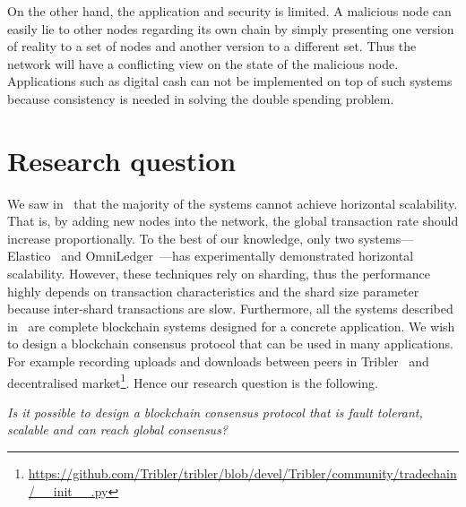 On the other hand, the application and security is limited.
A malicious node can easily lie to other nodes regarding its own chain by simply presenting one version of reality to a set of nodes and another version to a different set.
Thus the network will have a conflicting view on the state of the malicious node.
Applications such as digital cash can not be implemented on top of such systems because consistency is needed in solving the double spending problem.



\section{Research question}

We saw in~ that the majority of the systems cannot achieve horizontal scalability.
That is, by adding new nodes into the network, the global transaction rate should increase proportionally.
To the best of our knowledge, only two systems---Elastico~\cite{luu2016elastico} and OmniLedger~\cite{kokoris2017omniledger}---has experimentally demonstrated horizontal scalability.
However, these techniques rely on sharding, thus the performance highly depends on transaction characteristics and the shard size parameter because inter-shard transactions are slow.
Furthermore, all the systems described in~ are complete blockchain systems designed for a concrete application.
We wish to design a blockchain consensus protocol that can be used in many applications.
For example recording uploads and downloads between peers in Tribler~\cite{pouwelse2008tribler, multichain} and decentralised market\footnote{\url{https://github.com/Tribler/tribler/blob/devel/Tribler/community/tradechain/__init__.py}}.
Hence our research question is the following.
\begin{displayquote}
\emph{Is it possible to design a blockchain consensus protocol that is fault tolerant, scalable and can reach global consensus?}
\end{displayquote}

